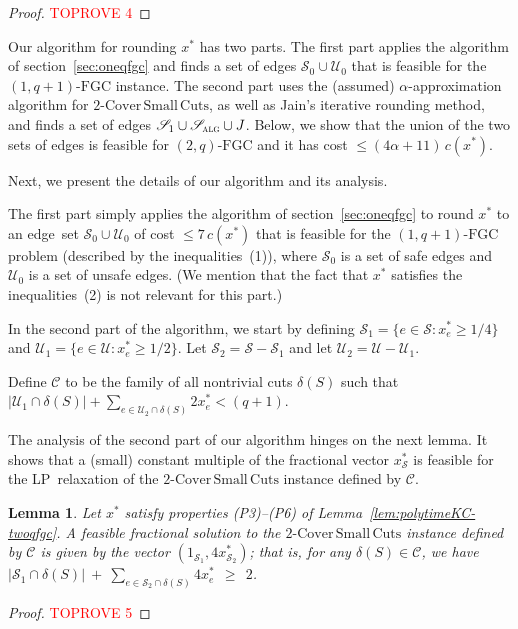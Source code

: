 \documentclass[11pt]{article}
\newtheorem{lemma}[theorem]{Lemma}
\newcommand{\safe}{\mathscr{S}}
\newcommand{\unsafe}{\mathscr{U}}
\newcommand{\fgc}{\mathrm{FGC}}
\newcommand{\oneqplusfgc}{(1,q+1)\text{-}\fgc}
\newcommand{\C}{\mathscr{C}}
\newcommand{\J}{{J}}
\newcommand{\alg}{\textsc{alg}}
\newcommand{\twoqfgc}{(2,q)\text{-}\fgc}
\newcommand\twoASC{\mathrm{2\text{-}Cover\,Small\,Cuts}}
\begin{document}
{{{\begin{proof}\textcolor{red}{TOPROVE 4}\end{proof}
}


Our algorithm for rounding $x^*$ has two parts.
The first part applies the algorithm of section~\ref{sec:oneqfgc}
and finds a set of edges $\safe_0\cup\unsafe_0$ that is feasible
for the $\oneqplusfgc$ instance.
The second part uses the (assumed) $\alpha$-approximation algorithm
for $\twoASC$, as well as Jain's iterative rounding method, and finds
a set of edges $\safe_1\cup\safe_{\alg}\cup{\J}$.
Below, we show that the union of the two sets of edges is feasible
for $\twoqfgc$ and it has cost $\leq(4 \alpha + 11)\,c(x^*)$.

Next, we present the details of our algorithm and its analysis.

The first part simply applies the algorithm of section~\ref{sec:oneqfgc}
to round $x^*$ to an edge~set $\safe_0\cup\unsafe_0$ of cost
$\leq7\,c(x^*)$ that is feasible for the $\oneqplusfgc$ problem
(described by the inequalities~(1)), where $\safe_0$ is a set of
safe edges and $\unsafe_0$ is a set of unsafe edges.
(We mention that the fact that $x^*$ satisfies the inequalities~(2)
is not relevant for this part.)


In the second part of the algorithm, we start by
defining $\safe_1 = \{e\in\safe: x^*_e\geq 1/4\}$ and
$\unsafe_1 = \{e\in\unsafe: x^*_e\geq 1/2\}$.
Let $\safe_2 = \safe - \safe_1$ and
let $\unsafe_2 = \unsafe - \unsafe_1$.

Define $\C$ to be the family of all nontrivial cuts $\delta(S)$ such that
$|\unsafe_1\cap \delta(S)| + \sum_{e\in \unsafe_2 \cap\delta(S)} 2x^*_e < (q+1)$.


{
The analysis of the second part of our algorithm hinges on the next
lemma.  It shows that a (small) constant multiple of the fractional
vector $x^*_{\safe}$ is feasible for the LP~relaxation of the
$\twoASC$ instance defined by $\C$.

\begin{lemma} \label{lem:safepart-twoqfgc}
Let $x^*$ satisfy properties (P3)--(P6) of Lemma~\ref{lem:polytimeKC-twoqfgc}.
A feasible fractional solution to the $\twoASC$ instance defined
by $\C$ is given by the vector $(1_{\safe_1}, 4 x^*_{\safe_2})$; that is,
for any $\delta(S)\in\C$, we have
$|\safe_1\cap\delta(S)| \:+\: \sum_{e\in \safe_2\cap\delta(S)} 4x^*_e \:\:\geq\:\: 2$.
\end{lemma}

\begin{proof}\textcolor{red}{TOPROVE 5}\end{proof}
}


}}
\end{document}
